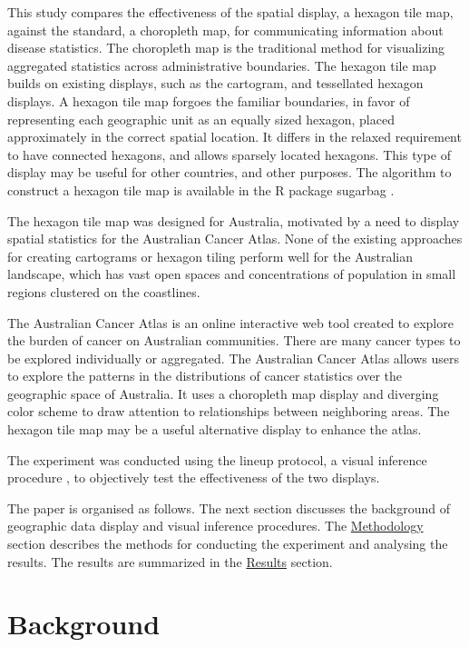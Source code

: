 \documentclass{monashthesis}
\begin{document}
This study compares the effectiveness of the spatial display, a hexagon tile map, against the standard, a choropleth map, for communicating information about disease statistics. The choropleth map is the traditional method for visualizing aggregated statistics across administrative boundaries. The hexagon tile map builds on existing displays, such as the cartogram, and tessellated hexagon displays. A hexagon tile map forgoes the familiar boundaries, in favor of representing each geographic unit as an equally sized hexagon, placed approximately in the correct spatial location. It differs in the relaxed requirement to have connected hexagons, and allows sparsely located hexagons. This type of display may be useful for other countries, and other purposes. The algorithm to construct a hexagon tile map is available in the R package sugarbag \autocite{sugarbag}.

The hexagon tile map was designed for Australia, motivated by a need to display spatial statistics for the Australian Cancer Atlas. None of the existing approaches for creating cartograms or hexagon tiling perform well for the Australian landscape, which has vast open spaces and concentrations of population in small regions clustered on the coastlines.

The Australian Cancer Atlas \autocite{TACA} is an online interactive web tool created to explore the burden of cancer on Australian communities. There are many cancer types to be explored individually or aggregated. The Australian Cancer Atlas allows users to explore the patterns in the distributions of cancer statistics over the geographic space of Australia. It uses a choropleth map display and diverging color scheme to draw attention to relationships between neighboring areas. The hexagon tile map may be a useful alternative display to enhance the atlas.

The experiment was conducted using the lineup protocol, a visual inference procedure \autocite{GIIV}, to objectively test the effectiveness of the two displays.

The paper is organised as follows. The next section discusses the background of geographic data display and visual inference procedures. The \protect\hyperlink{methodology}{Methodology} section describes the methods for conducting the experiment and analysing the results. The results are summarized in the \protect\hyperlink{results}{Results} section.

\hypertarget{background}{%
\section{Background}\label{background}}
\end{document}
